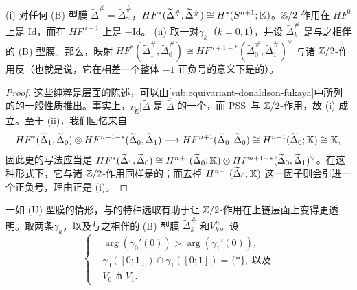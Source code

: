 \begin{lemma}\label{thm:type-b-equivariant-hf}
(i) 对任何 (B) 型\trEquivariant{}膜 $\widetilde{\Delta}^{\#}=\widetilde{\Delta}^{\#}_\gamma$，$HF^*(\widetilde{\Delta}^{\#},\widetilde{\Delta}^{\#})\cong H^*(S^{n+1};\mathbb{K})$。$\mathbb{Z}/2$-作用在 $HF^0$ 上是 $\mathrm{Id}$，而在 $HF^{n+1}$ 上是 $-\mathrm{Id}$。
(ii) 取一对\trVanishingPath{}$\gamma_k$（$k=0,1$），并设 $\widetilde{\Delta}^{\#}_k$ 是与之相伴的 (B) 型\trEquivariant{}膜。那么，\trPoincareDuality{}映射 $HF^*(\widetilde{\Delta}^{\#}_1,\widetilde{\Delta}^{\#}_0)\cong HF^{n+1-*}(\widetilde{\Delta}^{\#}_0,\widetilde{\Delta}^{\#}_1)^{\vee}$ 与诸 $\mathbb{Z}/2$-作用反\trCompatible（也就是说，它在相差一个整体 $-1$ 正负号的意义下是\trEquivariant{}的）。
\end{lemma}
\begin{proof}
这些纯粹是\trCohomology{}层面的陈述，可以由\cref{sub:equivariant-donaldson-fukaya}中所列的\trEquivariant{}\trFloerCohomology{}的一般性质推出。事实上，$\iota_{\widetilde{E}}|\widetilde{\Delta}$ 是 $\widetilde{\Delta}$ 的一个\trOrientationReversing{}\trAutomorphism，而 PSS~\trIsomorphism{}与 $\mathbb{Z}/2$-作用\trCompatible，故 (i) 成立。至于 (ii)，我们回忆\trPoincareDuality{}\trIsomorphism{}来自\trTriangleProduct
\begin{equation*}
HF^*(\widetilde{\Delta}_1,\widetilde{\Delta}_0)\otimes HF^{n+1-*}(\widetilde{\Delta}_0,\widetilde{\Delta}_1)
\longrightarrow HF^{n+1}(\widetilde{\Delta}_0,\widetilde{\Delta}_0)\cong H^{n+1}(\widetilde{\Delta}_0;\mathbb{K})\cong\mathbb{K},
\end{equation*}
因此更\trCanonical{}的写法应当是 $HF^*(\widetilde{\Delta}_1,\widetilde{\Delta}_0)\cong H^{n+1}(\widetilde{\Delta}_0;\mathbb{K})\otimes HF^{n+1-*}(\widetilde{\Delta}_0,\widetilde{\Delta}_1)^{\vee}$。在这种形式下，它与诸 $\mathbb{Z}/2$-作用同样是\trCompatible{}的；而去掉 $H^{n+1}(\widetilde{\Delta}_0;\mathbb{K})$ 这一因子则会引进一个正负号，理由正是 (i)。
\end{proof}
一如 (U) 型膜的情形，\trFloerDatum{}与\trPerturbationDatum{}的特种选取有助于让 $\mathbb{Z}/2$-作用在上链层面上变得更透明。取两条\trVanishingPath{}$\gamma_k$，以及与之相伴的 (B) 型膜 $\widetilde{\Delta}^{\#}_k$ 和\trVanishingCycle{}$V^n_k$。设
\begin{equation}\label{eq:two-vanishing-paths-position}
\left\{
\begin{aligned}
&\arg(\gamma_0'(0))>\arg(\gamma_1'(0)),\\
&\gamma_0([0;1])\cap\gamma_1([0;1])=\{*\},\ \text{以及}\\
&V_0\pitchfork V_1.
\end{aligned}
\right.
\end{equation}
